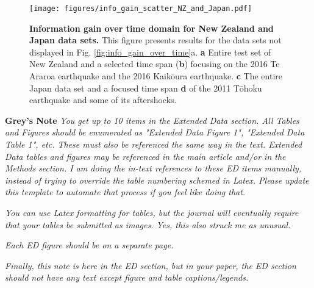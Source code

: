 \documentclass[pdflatex]{sn-jnl}
\begin{document}
\newpage
\begin{figure}[h!]
	\centering
        \texttt{[image: figures/info\_gain\_scatter\_NZ\_and\_Japan.pdf]}
	\caption{
            \textbf{Information gain over time domain for New Zealand and Japan data sets.} This figure presents results for the data sets not displayed in Fig. \ref{fig:info_gain_over_time}a. \textbf{a} Entire test set of New Zealand and a selected time span (\textbf{b}) focusing on the 2016 Te Araroa earthquake and the 2016 Kaikōura earthquake. \textbf{c} The entire Japan data set and a focused time span \textbf{d} of the 2011 Tōhoku earthquake and some of its aftershocks.
         }
\label{fig:intro_fig}
\end{figure}

\newpage



\textbf{Grey's Note} \textit{You get up to 10 items in the Extended Data section. All Tables and Figures should be enumerated as "Extended Data Figure 1", "Extended Data Table 1", etc. These must also be referenced the same way in the text. Extended Data tables and figures may be referenced in the main article and/or in the Methods section. I am doing the in-text references to these ED items manually, instead of trying to override the table numbering schemed in Latex. Please update this template to automate that process if you feel like doing that.}

\textit{You can use Latex formatting for tables, but the journal will eventually require that your tables be submitted as images. Yes, this also struck me as unusual.}

\textit{Each ED figure should be on a separate page.}

\textit{Finally, this note is here in the ED section, but in your paper, the ED section should not have any text except figure and table captions/legends.}
\end{document}
